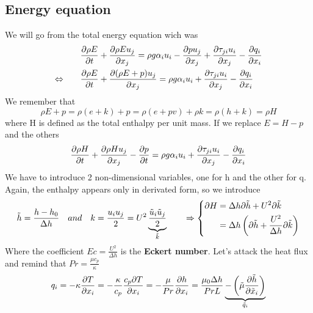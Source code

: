 	\subsection{Energy equation}
		We will go from the total energy equation wich was 
		\begin{equation}
		\begin{aligned}
			&\frac{\partial \rho E}{\partial t} + \frac{\partial \rho E u_j}{\partial x_j} = \rho g \alpha _i u_i - \frac{\partial p u_j}{\partial x_j} + \frac{\partial \tau _{ji} u_i}{\partial x_j} - \frac{\partial q_i}{\partial x_i}\\
			\Leftrightarrow \qquad &\frac{\partial \rho E}{\partial t} + \frac{\partial (\rho E+p) u_j}{\partial x_j} = \rho g \alpha _i u_i + \frac{\partial \tau _{ji} u_i}{\partial x_j} - \frac{\partial q_i}{\partial x_i}
		\end{aligned}
		\end{equation}
		We remember that 
		\begin{equation}
			\rho E + p = \rho (e+k) + p = \rho (e+ pv) + \rho k = \rho (h + k) = \rho H
		\end{equation}
		where H is defined as the total enthalpy per unit mass. If we replace $E = H -p$ and the others
		\begin{equation}
			\frac{\partial \rho H}{\partial t} + \frac{\partial \rho H u_j}{\partial x_j} - \frac{\partial  p}{\partial t} = \rho g \alpha _i u_i + \frac{\partial \tau _{ji} u_i}{\partial x_j} - \frac{\partial q_i}{\partial x_i}
			\label{eq:2.24}
		\end{equation}
		We have to introduce 2 non-dimensional variables, one for h and the other for q. Again, the enthalpy appears only in derivated form, so we introduce
		\begin{equation}
			\tilde{h} = \frac{h-h_0}{\Delta h} \quad and \quad k = \frac{u_i u_j}{2} = U^2 \underbrace{\frac{\tilde{u}_i \tilde{u}_j}{2}}_{\tilde{k}}
			\qquad \Rightarrow \left\{
			\begin{aligned}
			\partial H &= \Delta h \partial \tilde{h} + U^2 \partial \tilde{k}\\
					&= \Delta h \left( \partial\tilde{h} + \frac{U^2}{\Delta h}\partial \tilde{k} \right)
			\end{aligned}
			\right.
		\end{equation}
		Where the coefficient $Ec = \frac{U^2}{\Delta h}$ is the \textbf{Eckert number}. Let's attack the heat flux and remind that $Pr = \frac{\mu c_p}{\kappa}$
		\begin{equation}
			q_i = - \kappa \frac{\partial T}{\partial x_i} = - \frac{\kappa}{c_p} \frac{c_p \partial T}{\partial x_i} = - \frac{\mu }{Pr} \frac{\partial h}{\partial x_i} = \frac{\mu _0 \Delta h}{Pr L} \underbrace{- \left(\tilde{\mu} \frac{\partial \tilde{h}}{\partial \tilde{x}_i}\right)}_{\tilde{q}_i}
		\end{equation}
